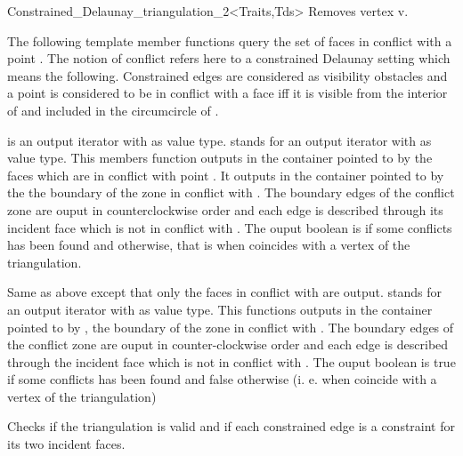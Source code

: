 \begin{ccRefClass}{Constrained_Delaunay_triangulation_2<Traits,Tds>}
{ Removes vertex v. }

The following template member functions query the
set of faces in conflict with a point .
The notion of conflict refers here to a 
constrained Delaunay setting which means the following.
Constrained edges are considered as visibility obstacles
and a point  is considered to be 
in conflict with a face  iff it is 
 visible from the interior of  and 
included in the circumcircle of .

{ 
 is an output iterator with  as value type.
 stands for an output iterator with  as value type.
This members function outputs in the container pointed to by 
the faces which are in conflict with point .
It outputs in the container pointed to by  the 
the boundary of the zone in conflict with .
The boundary edges
of the conflict  zone are ouput in counterclockwise order
and each edge is described  through its incident face
which is not in conflict with .
The ouput boolean is  if some conflicts has been found and 
otherwise, that is when  coincides with a vertex of the
triangulation.
}

{Same as above except that only the faces in conflict with 
are output.}
{  stands for an output iterator with  as value
type.
 This functions  outputs in the container pointed to by ,
the boundary of the zone in conflict with . The boundary edges
of the conflict  zone are ouput in counter-clockwise order
and each edge is described  through the incident face
which is not in conflict with .
The ouput boolean is true if some conflicts has been found and false
otherwise
(i. e. when  coincide with a vertex of the triangulation)}



{ Checks if the triangulation is valid and if each constrained edge is
a constraint for its two incident faces.}


\end{ccRefClass}
